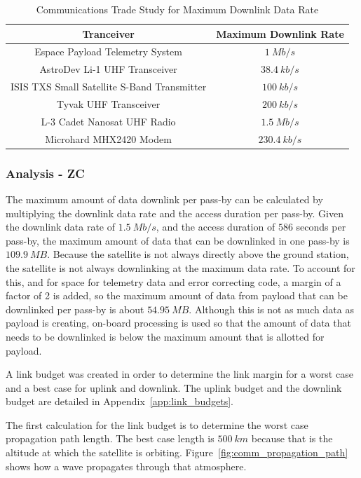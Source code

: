\documentclass[12pt]{article}
\begin{document}
\begin{table}[ht]
\caption{Communications Trade Study for Maximum Downlink Data Rate}
\begin{center}
    \begin{tabular}{| c | c |} \hline
    	Tranceiver & Maximum Downlink Rate \\ \hline \hline
Espace Payload Telemetry System & $1\ Mb/s$ \\
AstroDev Li-1 UHF Transceiver & $38.4\ kb/s$ \\
ISIS TXS Small Satellite  S-Band Transmitter & $100\ kb/s$ \\
Tyvak UHF Transceiver & $200\ kb/s$ \\
L-3 Cadet Nanosat UHF Radio & $1.5\ Mb/s$ \\
Microhard MHX2420 Modem & $230.4\ kb/s$ \\ \hline 
    \end{tabular}\label{table:comm_transceivers}
\end{center}
\end{table}

			\subsubsection{Analysis - ZC}

The maximum amount of data downlink per pass-by can be calculated by multiplying the downlink data rate and the access duration per pass-by. Given the downlink data rate of $1.5\ Mb/s$, and the access duration of $586$ seconds per pass-by, the maximum amount of data that can be downlinked in one pass-by is $109.9\ MB$. Because the satellite is not always directly above the ground station, the satellite is not always downlinking at the maximum data rate. To account for this, and for space for telemetry data and error correcting code, a margin of a factor of 2 is added, so the maximum amount of data from payload that can be downlinked per pass-by is about $54.95\ MB$. Although this is not as much data as payload is creating, on-board processing is used so that the amount of data that needs to be downlinked is below the maximum amount that is allotted for payload.

A link budget was created in order to determine the link margin for a worst case and a best case for uplink and downlink. The uplink budget and the downlink budget are detailed in Appendix~\ref{app:link_budgets}.

The first calculation for the link budget is to determine the worst case propagation path length. The best case length is $500\ km$ because that is the altitude at which the satellite is orbiting. Figure~\ref{fig:comm_propagation_path} shows how a wave propagates through that atmosphere.
\end{document}
